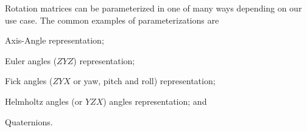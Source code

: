 \begin{tcolorbox}[title=Summary of Parameterizations]
	Rotation matrices can be parameterized in one of many ways depending on our use case. The common examples of parameterizations are 
	\begin{inparaenum} \newline
		\item Axis-Angle representation; \newline
		\item Euler  angles ($ZYZ$) representation; \newline
		\item Fick  angles (\ie $ZYX$ or yaw, pitch and roll)  representation; \newline
		\item Helmholtz angles (or $YZX$) angles representation; and \newline
		\item Quaternions.
	\end{inparaenum}
	
\end{tcolorbox}

